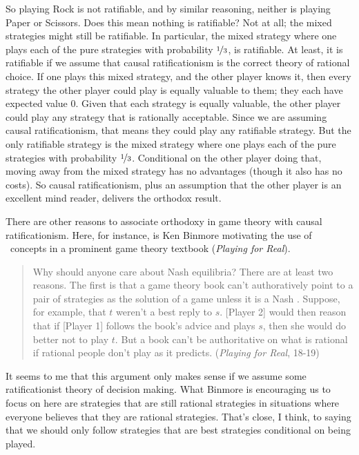 So playing Rock is not ratifiable, and by similar reasoning, neither is playing Paper or Scissors. Does this mean nothing is ratifiable? Not at all; the mixed strategies might still be ratifiable. In particular, the mixed strategy where one plays each of the pure strategies with probability $\nicefrac{1}{3}$, is ratifiable. At least, it is ratifiable if we assume that causal ratificationism is the correct theory of rational choice. If one plays this mixed strategy, and the other player knows it, then every strategy the other player could play is equally valuable to them; they each have expected value 0. Given that each strategy is equally valuable, the other player could play any strategy that is rationally acceptable. Since we are assuming causal ratificationism, that means they could play any ratifiable strategy. But the only ratifiable strategy is the mixed strategy  where one plays each of the pure strategies with probability $\nicefrac{1}{3}$. Conditional on the other player doing that, moving away from the mixed strategy has no advantages (though it also has no costs). So causal ratificationism, plus an assumption that the other player is an excellent mind reader, delivers the orthodox result.

There are other reasons to associate orthodoxy in game theory with causal ratificationism. Here, for instance, is Ken Binmore motivating the use of \eqm\ concepts in a prominent game theory textbook (\textit{Playing for Real}).

\begin{quote}
Why should anyone care about Nash equilibria? There are at least two reasons. The first is that a game theory book can't authoratively point to a pair of strategies as the solution of a game unless it is a Nash \eqm. Suppose, for example, that $t$ weren't a best reply to $s$. [Player 2] would then reason that if [Player 1] follows the book's advice and plays $s$, then she would do better not to play $t$. But a book can't be authoritative on what is rational if rational people don't play as it predicts. (\textit{Playing for Real}, 18-19)
\end{quote}

\noindent It seems to me that this argument only makes sense if we assume some ratificationist theory of decision making. What Binmore is encouraging us to focus on here are strategies that are still rational strategies in situations where everyone believes that they are rational strategies. That's close, I think, to saying that we should only follow strategies that are best strategies conditional on being played.


